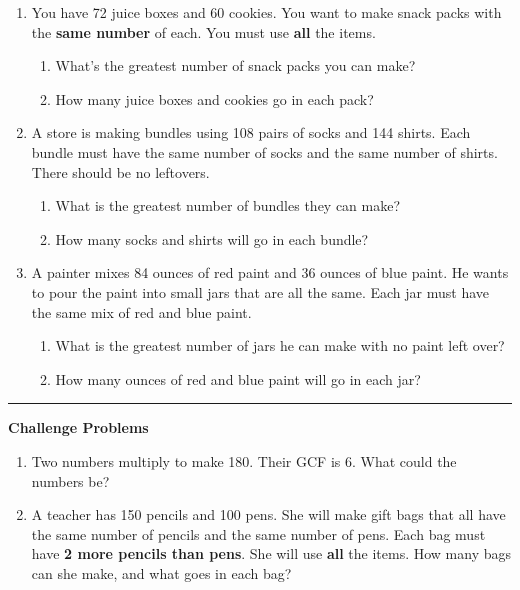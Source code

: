 \documentclass[
  letterpaper,
  DIV=11,
  numbers=noendperiod]{scrreprt}
\providecommand{\tightlist}{%
  \setlength{\itemsep}{0pt}\setlength{\parskip}{0pt}}
\begin{document}
\begin{enumerate}
\def\labelenumi{\arabic{enumi}.}
\setcounter{enumi}{5}
\item
  You have 72 juice boxes and 60 cookies. You want to make snack packs
  with the \textbf{same number} of each. You must use \textbf{all} the
  items.

  \begin{enumerate}
  \def\labelenumii{\alph{enumii}.}
  \tightlist
  \item
    What's the greatest number of snack packs you can make?
  \item
    How many juice boxes and cookies go in each pack?
  \end{enumerate}
\item
  A store is making bundles using 108 pairs of socks and 144 shirts.
  Each bundle must have the same number of socks and the same number of
  shirts. There should be no leftovers.

  \begin{enumerate}
  \def\labelenumii{\alph{enumii}.}
  \tightlist
  \item
    What is the greatest number of bundles they can make?
  \item
    How many socks and shirts will go in each bundle?
  \end{enumerate}
\item
  A painter mixes 84 ounces of red paint and 36 ounces of blue paint. He
  wants to pour the paint into small jars that are all the same. Each
  jar must have the same mix of red and blue paint.

  \begin{enumerate}
  \def\labelenumii{\alph{enumii}.}
  \tightlist
  \item
    What is the greatest number of jars he can make with no paint left
    over?
  \item
    How many ounces of red and blue paint will go in each jar?
  \end{enumerate}
\end{enumerate}

\begin{center}\rule{0.5\linewidth}{0.5pt}\end{center}

\textbf{Challenge Problems}

\begin{enumerate}
\def\labelenumi{\arabic{enumi}.}
\setcounter{enumi}{8}
\item
  Two numbers multiply to make 180. Their GCF is 6. What could the
  numbers be?
\item
  A teacher has 150 pencils and 100 pens. She will make gift bags that
  all have the same number of pencils and the same number of pens. Each
  bag must have \textbf{2 more pencils than pens}. She will use
  \textbf{all} the items. How many bags can she make, and what goes in
  each bag?
\end{enumerate}
\end{document}
